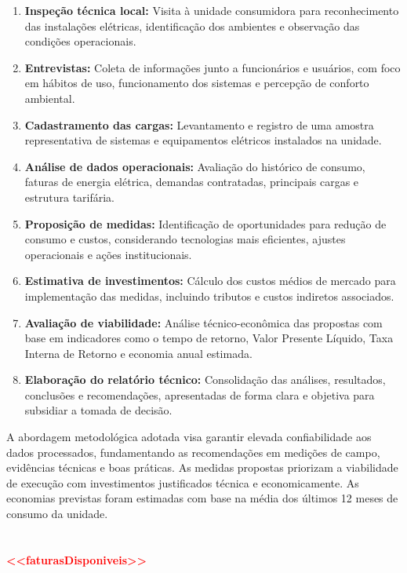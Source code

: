 \begin{enumerate}
    \item \textbf{Inspeção técnica local:} Visita à unidade consumidora para reconhecimento das instalações elétricas, identificação dos ambientes e observação das condições operacionais.
    
    \item \textbf{Entrevistas:} Coleta de informações junto a funcionários e usuários, com foco em hábitos de uso, funcionamento dos sistemas e percepção de conforto ambiental.
    
    \item \textbf{Cadastramento das cargas:} Levantamento e registro de uma amostra representativa de sistemas e equipamentos elétricos instalados na unidade.
    
    \item \textbf{Análise de dados operacionais:} Avaliação do histórico de consumo, faturas de energia elétrica, demandas contratadas, principais cargas e estrutura tarifária.
    
    \item \textbf{Proposição de medidas:} Identificação de oportunidades para redução de consumo e custos, considerando tecnologias mais eficientes, ajustes operacionais e ações institucionais.
    
    \item \textbf{Estimativa de investimentos:} Cálculo dos custos médios de mercado para implementação das medidas, incluindo tributos e custos indiretos associados.
    
    \item \textbf{Avaliação de viabilidade:} Análise técnico-econômica das propostas com base em indicadores como o tempo de retorno, Valor Presente Líquido, Taxa Interna de Retorno e economia anual estimada.
    
    \item \textbf{Elaboração do relatório técnico:} Consolidação das análises, resultados, conclusões e recomendações, apresentadas de forma clara e objetiva para subsidiar a tomada de decisão.
\end{enumerate}

A abordagem metodológica adotada visa garantir elevada confiabilidade aos dados processados, fundamentando as recomendações em medições de campo, evidências técnicas e boas práticas. As medidas propostas priorizam a viabilidade de execução com investimentos justificados técnica e economicamente. As economias previstas foram estimadas com base na média dos últimos 12 meses de consumo da unidade. 
\\\\\\
{\textcolor{red}{\textbf{<<faturasDisponiveis>>}}}






